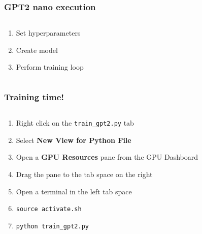 \documentclass[
	notes=none,
	aspectratio=169
]{beamer}
\begin{document}

\begin{frame}
\frametitle{GPT2 nano execution}

\begin{columns}[T]
\begin{column}[T]{1.0\textwidth}
\setlength{\parskip}{0.5em}

\vspace{0.0cm}
\begin{enumerate}
\setlength{\parskip}{0.5em}
\item Set hyperparameters
\item Create model
\item Perform training loop
\end{enumerate}

\end{column}
\end{columns}

\end{frame}
\note{
}


\begin{frame}
\frametitle{Training time!}

\begin{columns}[T]
\begin{column}[T]{1.0\textwidth}
\setlength{\parskip}{0.5em}

\vspace{0.0cm}
\begin{enumerate}
\setlength{\parskip}{0.5em}
\item Right click on the {\tt train\_gpt2.py} tab
\item Select {\bf New View for Python File}
\item Open a {\bf GPU Resources} pane from the GPU Dashboard
\item Drag the pane to the tab space on the right
\item Open a terminal in the left tab space
\item {\tt source activate.sh}
\item {\tt python train\_gpt2.py}
\end{enumerate}

\end{column}
\end{columns}

\end{frame}
\note{
}

\end{document}
